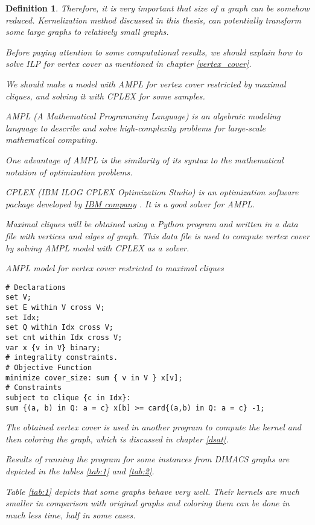\documentclass[12pt]{article}
\theoremstyle{slplain}
\newtheorem{defi}{Definition}
\begin{document}
\begin{defi}
Therefore, it is very important that size of a graph can be somehow reduced. 
Kernelization method discussed in this thesis, can potentially transform some large graphs to relatively small
graphs. 

Before paying attention to some computational results, we should explain how to solve ILP for vertex cover as mentioned in chapter \ref{vertex_cover}.

We should make a model with AMPL\cite{ampl} for vertex cover restricted by
maximal cliques, and solving it with CPLEX\cite{cplex} for some samples.

AMPL (A Mathematical Programming Language) is an algebraic modeling language to describe and solve high-complexity problems for large-scale mathematical computing. 

One advantage of AMPL is the similarity of its syntax to the mathematical notation of optimization problems.

CPLEX (IBM ILOG CPLEX Optimization Studio) is an optimization software package developed by \href{https://www.ibm.com/us-en/}{IBM company} \cite{IBM}. It is a good solver for AMPL.

Maximal cliques will be obtained using a Python program and written in a data file 
with vertices and edges of graph. This data file is used to compute vertex cover by solving AMPL model with CPLEX as a solver.



\newpage
AMPL model for vertex cover restricted to maximal cliques

\hline

\begin{verbatim}
# Declarations
set V;
set E within V cross V;
set Idx;
set Q within Idx cross V;
set cnt within Idx cross V;
var x {v in V} binary;
# integrality constraints.
# Objective Function
minimize cover_size: sum { v in V } x[v];
# Constraints
subject to clique {c in Idx}:
sum {(a, b) in Q: a = c} x[b] >= card{(a,b) in Q: a = c} -1;
\end{verbatim}

\newpage
The obtained vertex cover is used in another program to compute the
kernel and then coloring the graph, which is discussed in chapter \ref{dsat}.

Results of running the program for some instances from DIMACS graphs \cite{instance} are depicted in the tables \ref{tab:1} and \ref{tab:2}.

Table \ref{tab:1} depicts that some graphs behave very well. Their kernels are much smaller in comparison with original graphs and coloring them can be done in much less time, half in some cases. 


\end{defi}
\end{document}
